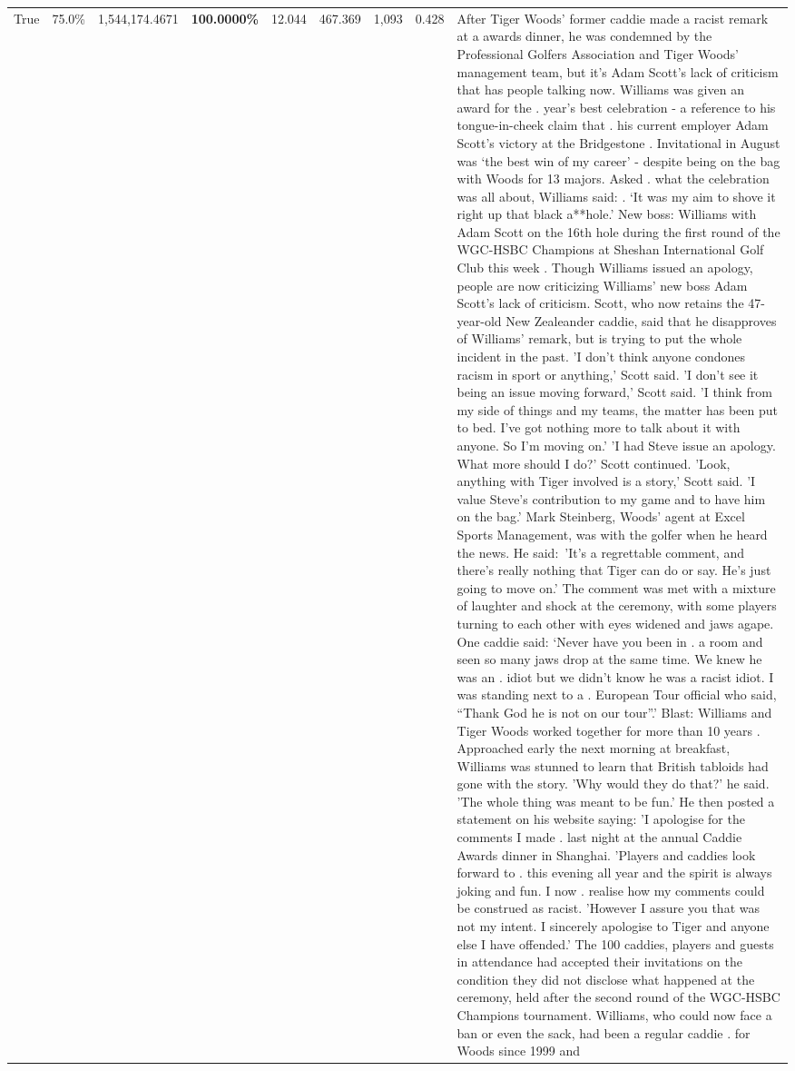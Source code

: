 \begin{table}[H]
\begin{tabular}{lllrlllll}
True & 75.0\% & 1,544,174.4671 & \bfseries \color{red} 100.0000\% & 12.044 & 467.369 & 1,093 & 0.428 & After Tiger Woods' former caddie made a racist remark at a awards dinner, he was condemned by the Professional Golfers Association and Tiger Woods' management team, but it's Adam Scott's lack of criticism that has people talking now. Williams was given an award for the . year’s best celebration - a reference to his tongue-in-cheek claim that . his current employer Adam Scott’s victory at the Bridgestone . Invitational in August was ‘the best win of my career’ - despite being on the bag with Woods for 13 majors. Asked . what the celebration was all about, Williams said: . ‘It was my aim to shove it right up that black a**hole.’ New boss: Williams with Adam Scott  on the 16th hole during the first round of the WGC-HSBC Champions at Sheshan International Golf Club this week . Though Williams issued an apology, people are now criticizing Williams' new boss Adam Scott's lack of criticism. Scott, who now retains the 47-year-old New Zealeander caddie, said that he disapproves of Williams' remark, but is trying to put the whole incident in the past. 'I don't think anyone condones racism in sport or anything,' Scott said. 'I don't see it being an issue moving forward,' Scott said. 'I think from my side of things and my teams, the matter has been put to bed. I've got nothing more to talk about it with anyone. So I'm moving on.' 'I had Steve issue an apology. What more should I do?' Scott continued. 'Look, anything with Tiger involved is a story,' Scott said. 'I value Steve's contribution to my game and to have him on the bag.' Mark Steinberg, Woods' agent at Excel Sports Management, was with the golfer when he heard the news. He said: 'It's a regrettable comment, and there's really nothing that Tiger can do or say. He's just going to move on.' The comment was met with a mixture of laughter and shock at the ceremony, with some players turning to each other with eyes widened and jaws agape. One caddie said: ‘Never have you been in . a room and seen so many jaws drop at the same time. We knew he was an . idiot but we didn’t know he was a racist idiot. I was standing next to a . European Tour official who said, “Thank God he is not on our tour”.’ Blast: Williams and Tiger Woods worked together for more than 10 years . Approached early the next morning at breakfast, Williams was stunned to learn that British tabloids had gone with the story. 'Why would they do that?' he said. 'The whole thing was meant to be fun.' He then posted a statement on his website saying: 'I apologise for the comments I made . last night at the annual Caddie Awards dinner in Shanghai. 'Players and caddies look forward to . this evening all year and the spirit is always joking and fun. I now . realise how my comments could be construed as racist. 'However I assure you that was not my intent. I sincerely apologise to Tiger and anyone else I have offended.' The 100 caddies, players and guests in attendance had accepted their invitations on the condition they did not disclose what happened at the ceremony, held after the second round of the WGC-HSBC Champions tournament. Williams, who could now face a ban or even the sack, had been a regular caddie . for Woods since 1999 and 
\end{tabular}
\end{table}
